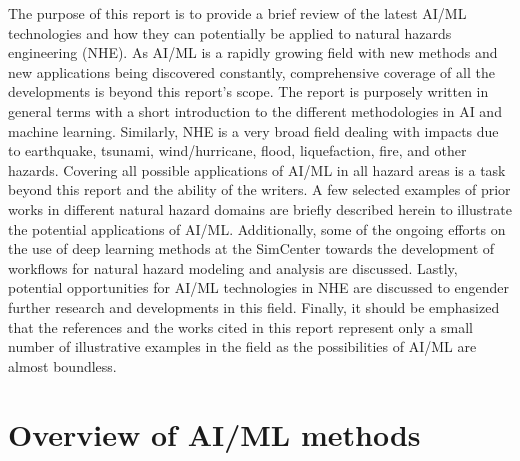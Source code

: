 The purpose of this report is to provide a brief review of the latest AI/ML technologies and how they can potentially be applied to natural hazards engineering (NHE). As AI/ML is a rapidly growing field with new methods and new applications being discovered constantly, comprehensive coverage of all the developments is beyond this report's scope. The report is purposely written in general terms with a short introduction to the different methodologies in AI and machine learning. Similarly, NHE is a very broad field dealing with impacts due to earthquake, tsunami, wind/hurricane, flood, liquefaction, fire, and other hazards. Covering all possible applications of AI/ML in all hazard areas is a task beyond this report and the ability of the writers. A few selected examples of prior works in different natural hazard domains are briefly described herein to illustrate the potential applications of AI/ML. Additionally, some of the ongoing efforts on the use of deep learning methods at the SimCenter towards the development of workflows for natural hazard modeling and analysis are discussed. Lastly, potential opportunities for AI/ML technologies in NHE are discussed to engender further research and developments in this field. Finally, it should be emphasized that the references and the works cited in this report represent only a small number of illustrative examples in the field as the possibilities of AI/ML are almost boundless. 

\section{Overview of AI/ML methods}
\label{sec:ai_methods}

